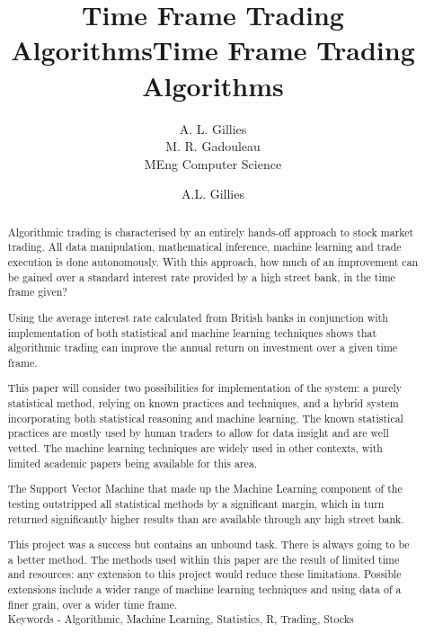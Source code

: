 \documentclass[conference]{IEEEtran}
\title{Time Frame Trading Algorithms}
\author{A. L. Gillies\\ M. R. Gadouleau\\ MEng Computer Science}
\title{Time Frame Trading Algorithms}
\author{A.L. Gillies}
\date{}
\begin{document}
\maketitle

\thispagestyle{plain}
\pagestyle{plain}

\noindent
\begin{abstract}

Algorithmic trading is characterised by an entirely hands-off approach to stock market trading. All data manipulation, mathematical inference, machine learning and trade execution is done autonomously. With this approach, how much of an improvement can be gained over a standard interest rate provided by a high street bank, in the time frame given?

Using the average interest rate calculated from British banks in conjunction with implementation of both statistical and machine learning techniques shows that algorithmic trading can improve the annual return on investment over a given time frame.

This paper will consider two possibilities for implementation of the system: a purely statistical method, relying on known practices and techniques, and a hybrid system incorporating both statistical reasoning and machine learning. The known statistical practices are mostly used by human traders to allow for data insight and are well vetted. \cite{Murphy1999} The machine learning techniques are widely used in other contexts, with limited academic papers being available for this area.

The Support Vector Machine that made up the Machine Learning component of the testing outstripped all statistical methods by a significant margin, which in turn returned significantly higher results than are available through any high street bank.

This project was a success but contains an unbound task. There is always going to be a better method. The methods used within this paper are the result of limited time and resources: any extension to this project would reduce these limitations. Possible extensions include a wider range of machine learning techniques and using data of a finer grain, over a wider time frame.\\

\noindent
Keywords - Algorithmic, Machine Learning, Statistics, R, Trading, Stocks

\end{abstract}
\end{document}
